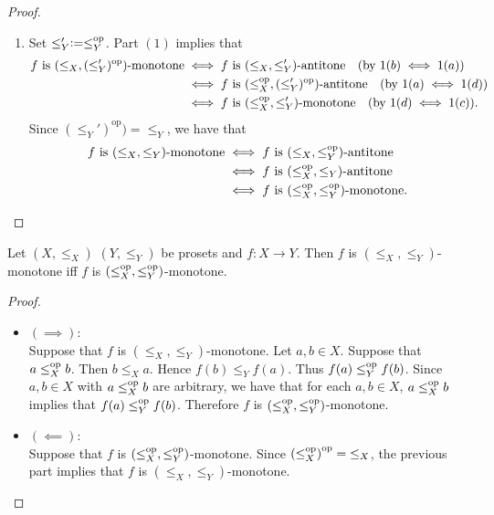 \documentclass{book}
\begin{document}
\begin{proof}
\begin{enumerate}
\begin{itemize}
			\end{itemize}
			\item Set $\leq_Y' \vcentcolon= \leq^{\text{op}}_Y$. Part $(1)$ implies that 
			\begin{align*}
				\text{$f$ is $(\leq_X, (\leq_Y')^{\text{op}})$-monotone}
				& \iff \text{$f$ is $(\leq_X, \leq_Y')$-antitone} \quad \text{(by $1(b) \iff 1(a)$)} \\
				& \iff \text{$f$ is $(\leq^{\text{op}}_X, (\leq_Y')^{\text{op}})$-antitone} \quad \text{(by $1(a) \iff 1(d)$)} \\
				& \iff \text{$f$ is $(\leq^{\text{op}}_X, \leq_Y')$-monotone} \quad \text{(by $1(d) \iff 1(c)$)}.
			\end{align*}
			Since $(\leq_Y')^{\text{op}}) = \leq_Y$, we have that
			\begin{align*}
				\text{$f$ is $(\leq_X, \leq_Y)$-monotone}
				& \iff \text{$f$ is $(\leq_X, \leq^{\text{op}}_Y)$-antitone} \\
				& \iff \text{$f$ is $(\leq^{\text{op}}_X, \leq_Y)$-antitone} \\
				& \iff \text{$f$ is $(\leq^{\text{op}}_X, \leq^{\text{op}}_Y)$-monotone}.
			\end{align*}
		\end{enumerate}
	\end{proof}
	
	\begin{ex} 
		Let $(X, \leq_X)$ $(Y, \leq_Y)$ be prosets and $f:X \rightarrow Y$. Then $f$ is $(\leq_X, \leq_Y)$-monotone iff $f$ is $(\leq^{\text{op}}_X, \leq^{\text{op}}_Y)$-monotone.
	\end{ex}
	
	\begin{proof}\
		\begin{itemize}
			\item $(\implies)$: \\
			Suppose that $f$ is $(\leq_X, \leq_Y)$-monotone. Let $a,b \in X$. Suppose that $a \leq^{\text{op}}_X b$. Then $b \leq_X a$. Hence $f(b) \leq_Y f(a)$. Thus $f(a) \leq^{\text{op}}_Y f(b)$. Since $a,b \in X$ with $a \leq^{\text{op}}_X b$ are arbitrary, we have that for each $a,b \in X$, $a \leq^{\text{op}}_X b$ implies that $f(a) \leq^{\text{op}}_Y f(b)$. Therefore $f$ is $(\leq^{\text{op}}_X, \leq^{\text{op}}_Y)$-monotone.
			\item $(\impliedby)$: \\
			Suppose that $f$ is $(\leq^{\text{op}}_X, \leq^{\text{op}}_Y)$-monotone. Since ${(\leq^{\text{op}}_X)}^{\text{op}} = {\leq_X}$, the previous part implies that $f$ is $(\leq_X, \leq_Y)$-monotone.
		\end{itemize}
	\end{proof}
	
\end{document}
